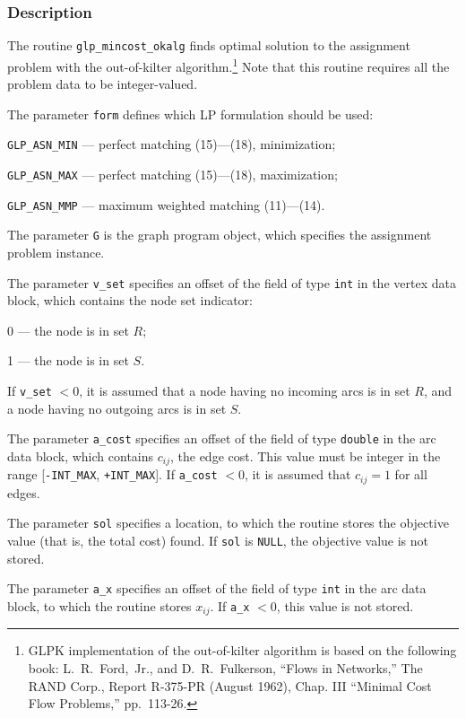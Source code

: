 \documentclass[dvipdfm,11pt]{report}
\begin{document}
\subsubsection*{Description}

The routine \verb|glp_mincost_okalg| finds optimal solution to the
assignment problem with the out-of-kilter
algorithm.\footnote{GLPK implementation of the out-of-kilter algorithm
is based on the following book: L.~R.~Ford,~Jr., and D.~R.~Fulkerson,
``Flows in Networks,'' The RAND Corp., Report R-375-PR (August 1962),
Chap. III ``Minimal Cost Flow Problems,'' pp.~113-26.} Note that this
routine requires all the problem data to be integer-valued.

The parameter \verb|form| defines which LP formulation should be used:

\verb|GLP_ASN_MIN| --- perfect matching (15)---(18), minimization;

\verb|GLP_ASN_MAX| --- perfect matching (15)---(18), maximization;

\verb|GLP_ASN_MMP| --- maximum weighted matching (11)---(14).

The parameter \verb|G| is the graph program object, which specifies the
assignment problem instance.

The parameter \verb|v_set| specifies an offset of the field of type
\verb|int| in the vertex data block, which contains the node set
indicator:

0 --- the node is in set $R$;

1 --- the node is in set $S$.

\newpage

\noindent
If \verb|v_set| $<0$, it is assumed that a node having no incoming arcs
is in set $R$, and a node having no outgoing arcs is in set $S$.

The parameter \verb|a_cost| specifies an offset of the field of type
\verb|double| in the arc data block, which contains $c_{ij}$, the edge
cost. This value must be integer in the range [\verb|-INT_MAX|,
\verb|+INT_MAX|]. If \verb|a_cost| $<0$, it is assumed that $c_{ij}=1$
for all edges.

The parameter \verb|sol| specifies a location, to which the routine
stores the objective value (that is, the total cost) found.
If \verb|sol| is \verb|NULL|, the objective value is not stored.

The parameter \verb|a_x| specifies an offset of the field of type
\verb|int| in the arc data block, to which the routine stores $x_{ij}$.
If \verb|a_x| $<0$, this value is not stored.
\end{document}
